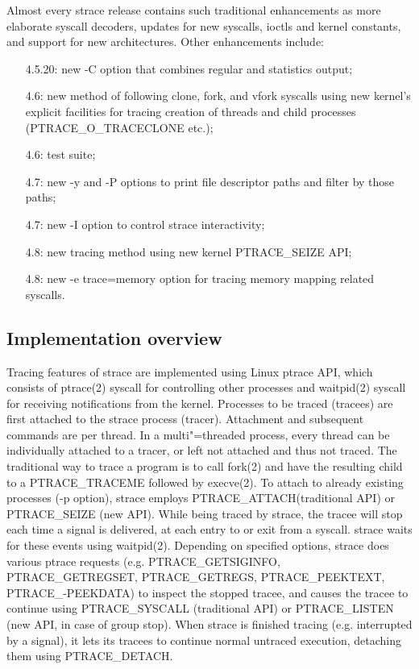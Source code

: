 \documentclass[10pt, a5paper]{article}
\begin{document}
Almost every strace release contains such traditional enhancements as  more elaborate syscall decoders, updates for new syscalls, ioctls and kernel constants, and support for new architectures.  Other \linebreak enhancements include:

\begin{itemize}
  \item [4.5.20:] new -C option that combines regular and statistics output;
  \item [4.6:] new method of following clone, fork, and vfork syscalls using new kernel's explicit facilities for tracing creation of threads and child processes (PTRACE\_O\_TRACECLONE etc.);
  \item [4.6:] test suite;
  \item [4.7:] new -y and -P options to print file descriptor paths and filter by those paths;
  \item [4.7:] new -I option to control strace interactivity;
  \item [4.8:] new tracing method using new kernel PTRACE\_SEIZE API;
  \item [4.8:] new -e trace=memory option for tracing memory mapping related syscalls.
\end{itemize}

\subsection*{Implementation overview}

Tracing features of strace are implemented using Linux ptrace API, which consists of ptrace(2) syscall for controlling other processes and waitpid(2) syscall for receiving notifications from the kernel.  Processes to be traced (tracees) are first attached to the strace process (tracer).  Attachment and subsequent commands are per thread.  In a multi"=threaded process, every thread can be individually attached to a tracer, or left not attached and thus not traced.  The traditional way to trace a program is to call fork(2) and have the resulting child to a \linebreak PTRACE\_TRACEME followed by execve(2).  To attach to  already existing processes (-p option), strace employs PTRACE\_ATTACH\linebreak (traditional API) or PTRACE\_SEIZE (new API).  While being traced by strace, the tracee will stop each time a signal is delivered, at each entry to or exit  from a syscall.  strace waits for these events using waitpid(2).  Depending on specified options, strace does various ptrace requests (e.g. PTRACE\_GETSIGINFO, PTRACE\_GETREGSET, \linebreak PTRACE\_GETREGS, PTRACE\_PEEKTEXT, PTRACE\_-\linebreak PEEKDATA) to inspect the stopped tracee, and causes the tracee to continue using PTRACE\_SYSCALL  (traditional API) or PTRACE\_LISTEN (new API, in case of group stop).  When strace is finished tracing (e.g. interrupted by a signal), it lets its tracees to continue normal untraced execution, detaching them using PTRACE\_DETACH.
\end{document}
